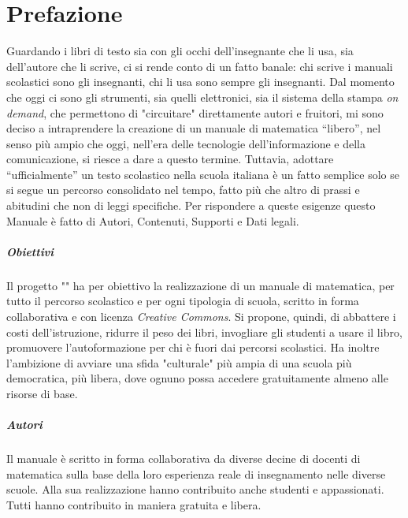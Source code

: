 \pagestyle{matc3page}
\chapter*{Prefazione}
Guardando i libri di testo sia con gli occhi dell'insegnante che li usa, sia dell'autore che li scrive, ci si rende
conto di un fatto banale: chi scrive i manuali scolastici sono gli insegnanti, chi li usa sono sempre gli
insegnanti. Dal momento che oggi ci sono gli strumenti, sia quelli elettronici, sia il sistema della stampa \textit{on demand},
che permettono di "circuitare" direttamente autori e fruitori, mi sono deciso a intraprendere la
creazione di un manuale di matematica “libero”, nel senso più ampio che oggi, nell'era delle tecnologie
dell'informazione e della comunicazione, si riesce a dare a questo termine. Tuttavia, adottare “ufficialmente” un
testo scolastico nella scuola italiana è un fatto semplice solo se si segue un percorso consolidato nel tempo,
fatto più che altro di prassi e abitudini che non di leggi specifiche. Per rispondere a queste esigenze questo
Manuale è fatto di Autori, Contenuti, Supporti e Dati legali.

\paragraph{Obiettivi} Il progetto "\serie" ha per obiettivo la realizzazione di un manuale di matematica, per
tutto il percorso scolastico e per ogni tipologia di scuola, scritto in forma collaborativa e con licenza \textit{Creative
Commons}. Si propone, quindi, di abbattere i costi dell'istruzione, ridurre il peso dei libri, invogliare gli
studenti a usare il libro, promuovere l'autoformazione
per chi è fuori dai percorsi scolastici. Ha inoltre l'ambizione di avviare una sfida "culturale" più
ampia di una scuola più democratica, più libera, dove ognuno possa accedere gratuitamente almeno alle
risorse di base.

\paragraph{Autori} Il manuale è scritto in forma collaborativa da diverse decine di docenti di matematica sulla base
della loro esperienza reale di insegnamento nelle diverse scuole. Alla sua realizzazione hanno contribuito
anche studenti e appassionati. Tutti hanno contribuito in maniera gratuita e libera.

